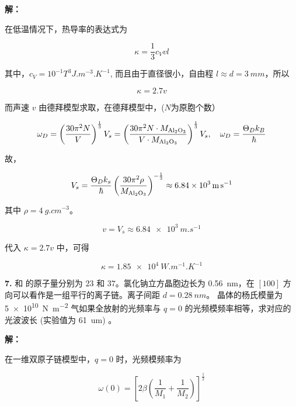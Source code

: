 \noindent \textbf{解：}

在低温情况下，热导率的表达式为

\begin{equation*}
    \kappa = \frac{1}{3} c_V v l
\end{equation*}

其中，$c_V=10^{-1} T^3 \unit{J.m^{-3}.K^{-1}}$, 而且由于直径很小，自由程 $l\approx d=\qty{3}{mm}$，所以

\begin{equation*}
    \kappa = 2.7 v
\end{equation*}

而声速 $v$ 由德拜模型求取，在德拜模型中，($N$为原胞个数）

\begin{equation*}
    \omega_D = \left(\frac{30\pi^2 N}{V}\right)^{\frac{1}{3}} V_s = \left(\frac{30 \pi^2 N \cdot M_{\ce{Al2O3}}}{V \cdot M_{\ce{Al2O3}}}\right)^{\frac{1}{3}} V_s, \quad \omega_D = \frac{\Theta_D k_B}{\hbar}
\end{equation*}

故，

\begin{equation*}
    V_s = \frac{\Theta_D k_s}{\hbar} \left(\frac{30 \pi^2 \rho}{M_{\ce{Al2O3}}}\right)^{-\frac{1}{3}} \approx \qty{6.84e3}{m.s^{-1}}
\end{equation*}

其中 $\rho=\qty{4}{g.cm^{-3}}$。

\begin{equation*}
    v = V_s \approx \qty{6.84e3}{m.s^{-1}}
\end{equation*}

代入 $\kappa=2.7 v$ 中，可得

\begin{equation*}
    \kappa = \qty{1.85e4}{W.m^{-1}.K^{-1}}
\end{equation*}

\noindent \textbf{7.\quad}  和  的原子量分别为 $23$ 和 $37$。氯化钠立方晶胞边长为 \qty{0.56}{nm}，在 $[100]$ 方向可以看作是一组平行的离子链。离子间距 $d=\qty{0.28}{nm}$。 晶体的杨氏模量为 \qty{5e10}{N.m^{-2}} 气如果全放射的光频率与 $q=0$ 的光频模频率相等，求对应的光波波长 (实验值为 \qty{61}{um}) 。

\noindent \textbf{解：}

在一维双原子链模型中，$q=0$ 时，光频模频率为

\begin{equation*}
    \omega(0) = \left[2\beta \left(\frac{1}{M_1}+\frac{1}{M_2}\right) \right]^{\frac{1}{2}}
\end{equation*}

